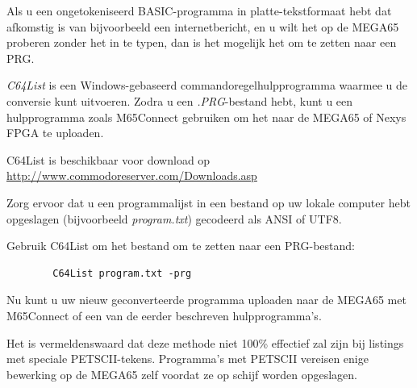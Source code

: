 Als u een ongetokeniseerd BASIC-programma in platte-tekstformaat hebt dat afkomstig is van bijvoorbeeld een internetbericht, en u wilt het op de MEGA65 proberen zonder het in te typen, dan is het mogelijk het om te zetten naar een PRG.

\textit{C64List} is een Windows-gebaseerd commandoregelhulpprogramma waarmee u de conversie kunt uitvoeren. Zodra u een \textit{.PRG}-bestand hebt, kunt u een hulpprogramma zoals M65Connect gebruiken om het naar de MEGA65 of Nexys FPGA te uploaden.

C64List is beschikbaar voor download op \url{http://www.commodoreserver.com/Downloads.asp}

Zorg ervoor dat u een programmalijst in een bestand op uw lokale computer hebt opgeslagen (bijvoorbeeld \textit{program.txt}) gecodeerd als ANSI of UTF8.

Gebruik C64List om het bestand om te zetten naar een PRG-bestand:
    
\begin{tcolorbox}[colback=black,coltext=white]
    \begin{verbatim}
        C64List program.txt -prg
    \end{verbatim}
\end{tcolorbox}

Nu kunt u uw nieuw geconverteerde programma uploaden naar de MEGA65 met M65Connect of een van de eerder beschreven hulpprogramma's.

Het is vermeldenswaard dat deze methode niet 100\% effectief zal zijn bij listings met speciale PETSCII-tekens. Programma's met PETSCII vereisen enige bewerking op de MEGA65 zelf voordat ze op schijf worden opgeslagen.
